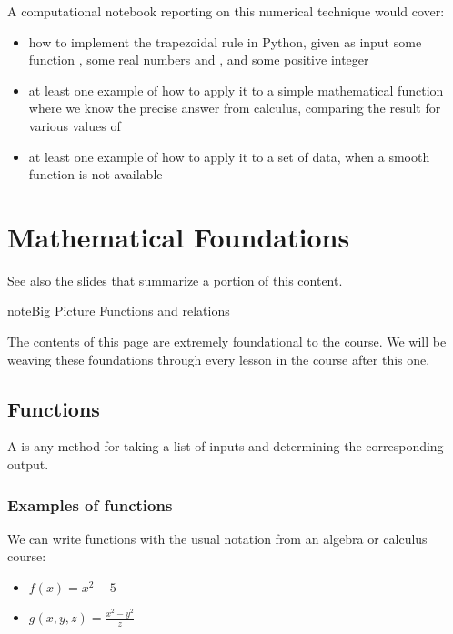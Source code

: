 \documentclass[letterpaper,10pt,english]{sphinxmanual}
\begin{document}
A computational notebook reporting on this numerical technique would cover:
\begin{itemize}
\item {} 
how to implement the trapezoidal rule in Python, given as input some function , some real numbers  and , and some positive integer 

\item {} 
at least one example of how to apply it to a simple mathematical function  where we know the precise answer from calculus, comparing the result for various values of 

\item {} 
at least one example of how to apply it to a set of data, when a smooth function  is not available

\end{itemize}


\chapter{Mathematical Foundations}
\label{\detokenize{chapter-2-mathematical-foundations:mathematical-foundations}}\label{\detokenize{chapter-2-mathematical-foundations::doc}}
See also the slides that summarize a portion of this content.

\begin{sphinxadmonition}{note}{Big Picture \sphinxhyphen{} Functions and relations}

The contents of this page are extremely foundational to the course.  We will be weaving these foundations through every lesson in the course after this one.
\end{sphinxadmonition}


\section{Functions}
\label{\detokenize{chapter-2-mathematical-foundations:functions}}
 A  is any method for taking a list of inputs and determining the corresponding output.


\subsection{Examples of functions}
\label{\detokenize{chapter-2-mathematical-foundations:examples-of-functions}}
 We can write functions with the usual notation from an algebra or calculus course:
\begin{itemize}
\item {} 
\(f(x)=x^2-5\)

\item {} 
\(g(x,y,z)=\frac{x^2-y^2}{z}\)

\end{itemize}
\end{document}
